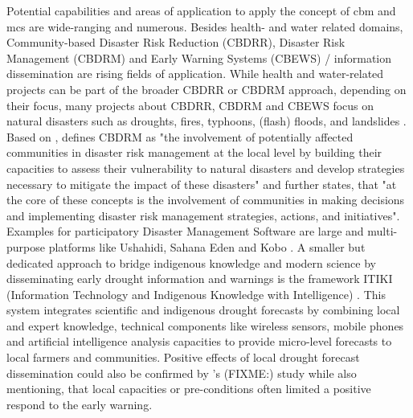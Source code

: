 Potential capabilities and areas of application to apply the concept of \acrshort*{cbm} and \acrshort*{mcs} are wide-ranging and numerous. Besides health- and water related domains, Community-based Disaster Risk Reduction (CBDRR), Disaster Risk Management (CBDRM) and Early Warning Systems (CBEWS) / information dissemination are rising fields of application. While health and water-related projects can be part of the broader CBDRR or CBDRM approach, depending on their focus, many projects about CBDRR, CBDRM and CBEWS focus on natural disasters such as droughts, fires, typhoons, (flash) floods, and landslides \autocite{machereraReviewStudiesCommunity2016,manaloBellBottleTechnology2013,pinedaRedefiningCommunityBased2015,smithCommunitybasedEarlyWarning2017,tarchianiCommunityImpactBased2020,trogrlicIndigenousKnowledgeEarly2018,vhumbunuCountingDayZero2021}. Based on \autocite{unisdrUNISDRTerminologyDisaster2009}, \autocite[198]{vhumbunuCountingDayZero2021} defines CBDRM as "the involvement of potentially affected communities in disaster risk management at the local level by building their capacities to assess their vulnerability to natural disasters and develop strategies necessary to mitigate the impact of these disasters" and further states, that "at the core of these concepts is the involvement of communities in making decisions and implementing disaster risk management strategies, actions, and initiatives".
Examples for participatory Disaster Management Software are large and multi-purpose platforms like Ushahidi, Sahana Eden and Kobo \autocite{koboorganizationKoboToolbox,sahanafoundationSahanaEDEN2016,ushahidiCrowdsourcingSolutionsEmpower}. A smaller but dedicated approach to bridge indigenous knowledge and modern science by disseminating early drought information and warnings is the framework ITIKI (Information Technology and Indigenous Knowledge with Intelligence) \autocite{akanbiDevelopmentRuleBasedDrought2018,masindeEffectiveDroughtEarly2014a,masindeImplementationRoadmapDownscaling2013,masindeDownscalingAfricaDrought2018,masindeFrameworkPredictingDroughts2010a,masindeITIKIBridgeAfrican2012,masindeITIKIMobileBased2019,nyetanyaneIntegrationIndigenousKnowledge2020,thothelaSurveyIntelligentAgroclimate2021a}. This system integrates scientific and indigenous drought forecasts by combining local and expert knowledge, technical components like wireless sensors, mobile phones and artificial intelligence analysis capacities to provide micro-level forecasts to local farmers and communities. Positive effects of local drought forecast dissemination could also be confirmed by \autocite{anderssonLocalEarlyWarning2020}'s (FIXME:) study while also mentioning, that local capacities or pre-conditions often limited a positive respond to the early warning.
